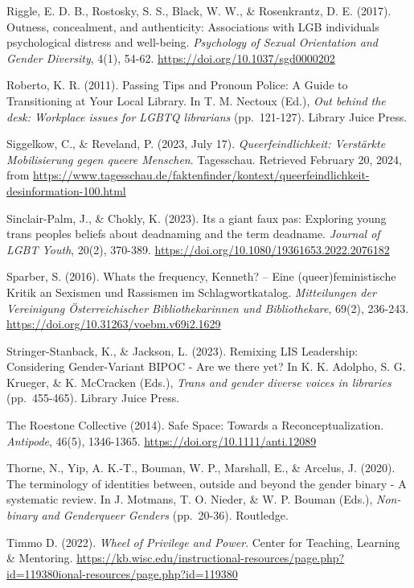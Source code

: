 \documentclass[a4paper,
fontsize=11pt,
oneside,
numbers=noperiodatend,
parskip=half-,
bibliography=totoc,
final
]{scrartcl}
\begin{document}
Riggle, E. D. B., Rostosky, S. S., Black, W. W., \& Rosenkrantz, D. E.
(2017). Outness, concealment, and authenticity: Associations with LGB
individuals\textquotesingle{} psychological distress and well-being.
\emph{Psychology of Sexual Orientation and Gender Diversity}, 4(1),
54-62. \url{https://doi.org/10.1037/sgd0000202}

Roberto, K. R. (2011). Passing Tips and Pronoun Police: A Guide to
Transitioning at Your Local Library. In T. M. Nectoux (Ed.), \emph{Out
behind the desk: Workplace issues for LGBTQ librarians} (pp.~121-127).
Library Juice Press.

Siggelkow, C., \& Reveland, P. (2023, July 17).
\emph{Queerfeindlichkeit: Verstärkte Mobilisierung gegen queere
Menschen}. Tagesschau. Retrieved February 20, 2024, from
\url{https://www.tagesschau.de/faktenfinder/kontext/queerfeindlichkeit-desinformation-100.html}

Sinclair-Palm, J., \& Chokly, K. (2023).
\textquotesingle It\textquotesingle s a giant faux pas\textquotesingle:
Exploring young trans people\textquotesingle s beliefs about deadnaming
and the term deadname. \emph{Journal of LGBT Youth}, 20(2), 370-389.
\url{https://doi.org/10.1080/19361653.2022.2076182}

Sparber, S. (2016). What\textquotesingle s the frequency, Kenneth? --
Eine (queer)feministische Kritik an Sexismen und Rassismen im
Schlagwortkatalog. \emph{Mitteilungen der Vereinigung Österreichischer
Bibliothekarinnen und Bibliothekare}, 69(2), 236-243.
\url{https://doi.org/10.31263/voebm.v69i2.1629}

Stringer-Stanback, K., \& Jackson, L. (2023). Remixing LIS Leadership:
Considering Gender-Vari\-ant BIPOC - Are we there yet? In K. K. Adolpho,
S. G. Krueger, \& K. McCracken (Eds.), \emph{Trans and gender diverse
voices in libraries} (pp.~455-465). Library Juice Press.

The Roestone Collective (2014). Safe Space: Towards a
Reconceptualization. \emph{Antipode}, 46(5), 1346-1365.
\url{https://doi.org/10.1111/anti.12089}

Thorne, N., Yip, A. K.-T., Bouman, W. P., Marshall, E., \& Arcelus, J.
(2020). The terminology of identities between, outside and beyond the
gender binary - A systematic review. In J. Motmans, T. O. Nieder, \& W.
P. Bouman (Eds.), \emph{Non-binary and Genderqueer Genders} (pp.~20-36).
Routledge.

Timmo D. (2022). \emph{Wheel of Privilege and Power}. Center for
Teaching, Learning \& Mentoring.
\url{https://kb.wisc.edu/instructional-resources/page.php?id=119380ional-resources/page.php?id=119380}
\end{document}
